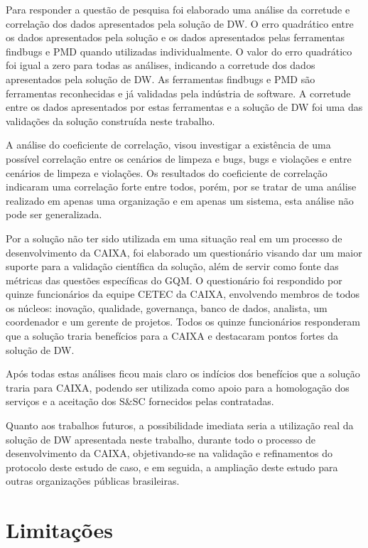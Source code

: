 Para responder a questão de pesquisa foi elaborado uma análise da corretude e correlação dos dados apresentados pela solução de DW. O erro quadrático entre os dados apresentados pela solução e os dados apresentados pelas ferramentas findbugs e PMD quando utilizadas individualmente. O valor do erro quadrático foi igual a zero para todas as análises, indicando a corretude dos dados apresentados pela solução de DW. As ferramentas findbugs e PMD são ferramentas reconhecidas e já validadas pela indústria de software. A corretude entre os dados apresentados por estas ferramentas e a solução de DW foi uma das validações da solução construída neste trabalho.

A análise do coeficiente de correlação, visou investigar a existência de uma possível correlação entre os cenários de limpeza e bugs, bugs e violações e entre cenários de limpeza e violações. Os resultados do coeficiente de correlação indicaram uma correlação forte entre todos, porém, por se tratar de uma análise realizado em apenas uma organização e em apenas um sistema, esta análise não pode ser generalizada.

Por a solução não ter sido utilizada em uma situação real em um processo de desenvolvimento da CAIXA, foi elaborado um questionário visando dar um maior suporte para a validação científica da solução, além de servir como fonte das métricas das questões específicas do GQM. O questionário foi respondido por quinze funcionários da equipe CETEC da CAIXA, envolvendo membros de todos os núcleos: inovação, qualidade, governança, banco de dados, analista, um coordenador e um gerente de projetos. Todos os quinze funcionários responderam que a solução traria benefícios para a CAIXA e destacaram pontos fortes da solução de DW.  

Após todas estas análises ficou mais claro os indícios dos benefícios que a solução traria para CAIXA, podendo ser utilizada como apoio para a homologação dos serviços e a aceitação dos S\&SC fornecidos pelas contratadas.  

Quanto aos trabalhos futuros, a possibilidade imediata seria a utilização real da solução de DW apresentada neste trabalho, durante todo o processo de desenvolvimento da CAIXA, objetivando-se na validação e refinamentos do protocolo deste estudo de caso, e em seguida, a ampliação deste estudo para outras organizações públicas brasileiras.  

\section{Limitações}


